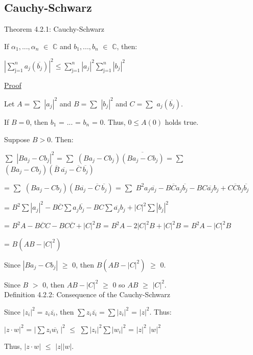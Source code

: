 \subsection{Cauchy-Schwarz} 

{ \color{red} Theorem 4.2.1: Cauchy-Schwarz } 

	\qquad If $\alpha_1 , ... , \alpha_n$ $\in$ $\mathbb{C}$ and $b_1 , ... , b_n$ $\in$
	$\mathbb{C}$, then:

	\qquad \qquad $| \sum_{\text{j=1}}^{n} a_j(\overline{b_j})  |^2 \leq
	\sum_{\text{j=1}}^{n} |a_j|^2 \sum_{\text{j=1}}^{n} |b_j|^2 $

{ \color{magenta} \underline{Proof} } 

	Let $A = \sum$ $|a_j|^2$ and $B = \sum$ $|b_j|^2$ and $C = \sum$ $a_j(\overline{b_j})$.

	If $B = 0$, then $b_1$ = ... = $b_n$ = 0. Thus, $0 \leq A(0)$ holds true.

	Suppose $B > 0$. Then:

	\qquad $\sum$ $|Ba_j - Cb_j|^2$ = $\sum$ $(Ba_j - Cb_j)\overline{(Ba_j - Cb_j)}$
	= $\sum$ $(Ba_j - Cb_j)(\overline{B} \ \overline{a_j} - \overline{C} \ \overline{b_j})$

	\qquad = $\sum$ $(Ba_j-Cb_j)(B\overline{a_j}-\overline{C} \ \overline{b_j})$
	= $\sum$ $B^2a_j\overline{a_j} - B\overline{C}a_j\overline{b_j} - BC\overline{a_j}b_j
	+ C\overline{C}b_j\overline{b_j}$

		\qquad = $B^2 \sum |a_j|^2 - B\overline{C}\sum a_j\overline{b_j}
	- BC \sum \overline{a_j}b_j+ |C|^2 \sum |b_j|^2$

	\qquad = $B^2A - B\overline{C}C - BC\overline{C} + |C|^2B$
	= $B^2A - 2|C|^2B + |C|^2B$ = $B^2A -|C|^2B$

	\qquad = $B(AB - |C|^2)$

	Since $| Ba_j - Cb_j |$ $\geq$ 0, then $B(AB - |C|^2)$ $\geq$ 0.

	Since $B$ $>$ 0, then $AB - |C|^2$ $\geq$ 0 so $AB$ $\geq$ $|C|^2$. \\

{ \color{blue} Definition 4.2.2: Consequence of the Cauchy-Schwarz } 

	Since $|z_i|^2 = z_i\overline{z_i}$, then
	$\sum z_i\overline{z_i} = \sum |z_i|^2$ = $|z|^2$. Thus:

	\qquad $|z \cdot w|^2$ = $|\sum z_i\overline{w_i} \ |^2$
	$\leq$ $\sum |z_i|^2 \sum |w_i|^2$ = $|z|^2$ $|w|^2$
	
	Thus, $|z \cdot w|$ $\leq$ $|z| |w|$.

